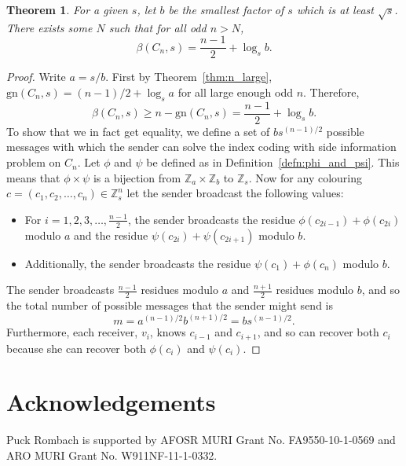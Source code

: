 \documentclass{birkjour}
\newtheorem{thm}{Theorem}[section]
\theoremstyle{indenteddefinition}
\theoremstyle{indenteddefinition}
\numberwithin{equation}{section}
\newcommand{\Z}{\mathbb{Z}}
\newcommand{\gn}{\mbox{gn}}
\renewcommand{\b}{\beta}
\begin{document}
\begin{thm}
\label{thm:defective}
For a given $s$, let $b$ be the smallest factor of $s$ which is at least $\sqrt{s}$. There exists some $N$ such that for all odd $n>N$, 
	$$ \b(C_n,s) = \frac{n-1}{2} + \log_sb. $$
\end{thm}
\begin{proof}
Write $a=s/b$. First by Theorem~\ref{thm:n_large}, $\gn(C_n,s) = (n-1)/2 +\log_sa$ for all large enough odd $n$. Therefore, 
	$$ \b(C_n,s) \geq n - \gn(C_n,s) = \frac{n-1}{2} + \log_sb. $$
To show that we in fact get equality, we define a set of $bs^{(n-1)/2}$ possible messages with which the sender can solve the index coding with side information problem on $C_n$. Let $\phi$ and $\psi$ be defined as in Definition~\ref{defn:phi_and_psi}. This means that $\phi \times \psi$ is a bijection from $\Z_a \times \Z_b$ to $\Z_s$. Now for any colouring $c = (c_1,c_2, \ldots ,c_n) \in \Z_s^n$ let the sender broadcast the following values: 
\begin{itemize}
\item For $i=1,2,3, \ldots ,\tfrac{n-1}{2}$, the sender broadcasts the residue $\phi(c_{2i-1})+\phi(c_{2i})$ modulo $a$ and 
the residue $\psi(c_{2i})+\psi(c_{2i+1})$ modulo $b$.
\item Additionally, the sender broadcasts the residue $\psi(c_1)+\phi(c_n)$ modulo $b$.
\end{itemize}
The sender broadcasts $\frac{n-1}{2}$ residues modulo $a$ and $\frac{n+1}{2}$ residues modulo $b$, and so the total number of possible messages that the sender might send is 
	$$ m = a^{(n-1)/2}b^{(n+1)/2} = bs^{(n-1)/2}. $$
Furthermore, each receiver, $v_i$, knows $c_{i-1}$ and $c_{i+1}$, and so can recover both $c_i$ because she can recover both $\phi(c_i)$ and $\psi(c_i)$. 
\end{proof}






\section{Acknowledgements}
Puck Rombach is supported by AFOSR MURI Grant No. FA9550-10-1-0569 and ARO MURI Grant No. W911NF-11-1-0332.



\end{document}

